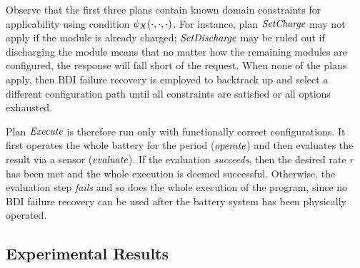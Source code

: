 Observe that the first three plans contain known domain constraints for applicability using condition $\psi_X(\cdot,\cdot,\cdot)$. For instance, plan $\operatorname{\textit{SetCharge}}$ may not apply if the module is already charged; $\operatorname{\textit{SetDischarge}}$ may be ruled out if discharging the module means that no matter how the remaining modules are configured, the response will fall short of the request. When none of the plans apply, then BDI failure recovery is employed to backtrack up and select a different configuration path until all constraints are satisfied or all options exhausted. 

Plan $\operatorname{\textit{Execute}}$ is therefore run only with functionally correct configurations. It first operates the whole battery for the period ($\operatorname{\textit{operate}}$) and then evaluates the result via a sensor ($\operatorname{\textit{evaluate}}$). If the evaluation \emph{succeeds}, then the desired rate $r$ has been met and the whole execution is deemed successful. Otherwise, the evaluation step \emph{fails} and so does the whole execution of the program, since no BDI failure recovery can be used after the battery system has been physically operated. 


\subsection{Experimental Results}\label{sec:results}

